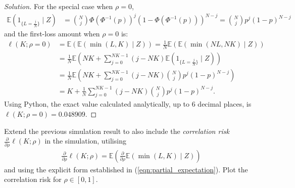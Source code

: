 \documentclass[10pt]{article}
\newcommand{\E}{\mathbb{E}}
\newenvironment{problem}[2][Problem]{\begin{trivlist}
\item[\hskip \labelsep {\bfseries #1}\hskip \labelsep {\bfseries #2.}]}{\end{trivlist}}
\begin{document}
\begin{proof}[Solution]
    For the special case when $\rho = 0$,
    \begin{align*}
        \E \left( 1_{\{L = \frac{j}{N}\}} \mid Z \right) &= \binom{N}{j} \Phi \left( \Phi^{-1}(p) \right)^j \left( 1 - \Phi \left( \Phi^{-1}(p) \right) \right)^{N-j} = \binom{N}{j} p^j (1 - p)^{N-j}
    \end{align*}
    and the first-loss amount when $\rho = 0$ is:
    \begin{align*}
        \ell(K; \rho = 0) &= \E(\E(\min(L, K) \mid Z)) = \frac{1}{N}\E(\E(\min(NL, NK) \mid Z)) \\
        &= \frac{1}{N}\E \left( NK + \sum_{j=0}^{NK-1} (j-NK) \E \left( 1_{\{L = \frac{j}{N}\}} \mid Z \right) \right) \\
        &= \frac{1}{N}\E \left( NK + \sum_{j=0}^{NK-1} (j-NK) \binom{N}{j} p^j (1 - p)^{N-j} \right) \\
        &= K + \frac{1}{N} \sum_{j=0}^{NK-1} (j-NK) \binom{N}{j} p^j (1 - p)^{N-j}.
    \end{align*}
    Using Python, the exact value calculated analytically, up to 6 decimal places, is $\ell(K; \rho = 0) = 0.048909$.
\end{proof}



\begin{problem}{9}
    Extend the previous simulation result to also include the \textit{correlation risk} $\frac{\partial}{\partial \rho} \ell(K; \rho)$ in the simulation, utilising
    \begin{align*}
        \frac{\partial}{\partial \rho} \ell(K; \rho) = \E \left( \frac{\partial}{\partial \rho} \E(\min(L, K) \mid Z) \right)
    \end{align*}
    and using the explicit form established in (\ref{eqn:partial_expectation}).
    Plot the correlation risk for $\rho \in [0,1]$.
\end{problem}
\end{document}
